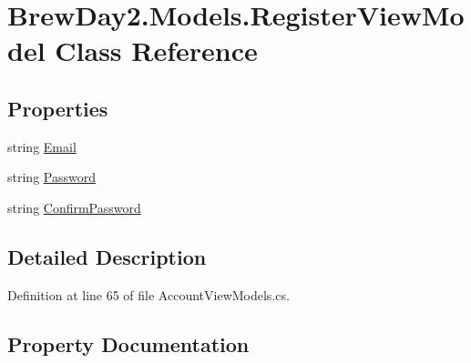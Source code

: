 \hypertarget{class_brew_day2_1_1_models_1_1_register_view_model}{}\section{Brew\+Day2.\+Models.\+Register\+View\+Model Class Reference}
\label{class_brew_day2_1_1_models_1_1_register_view_model}
\subsection*{Properties}
\begin{DoxyCompactItemize}
\item 
string \mbox{\hyperlink{class_brew_day2_1_1_models_1_1_register_view_model_af51784fc69b4716ef8d0f8ebbec2c205}{Email}}
\item 
string \mbox{\hyperlink{class_brew_day2_1_1_models_1_1_register_view_model_aec19deb8733add95af7daca5dc7cc184}{Password}}
\item 
string \mbox{\hyperlink{class_brew_day2_1_1_models_1_1_register_view_model_a3237fcdf659b5155e28a8f65ff605e8c}{Confirm\+Password}}
\end{DoxyCompactItemize}


\subsection{Detailed Description}


Definition at line 65 of file Account\+View\+Models.\+cs.



\subsection{Property Documentation}
\mbox{\label{class_brew_day2_1_1_models_1_1_register_view_model_a3237fcdf659b5155e28a8f65ff605e8c}} 
